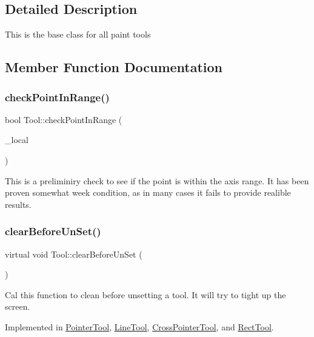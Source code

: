 \subsection{Detailed Description}
This is the base class for all paint tools 

\subsection{Member Function Documentation}
\mbox{\label{classTool_a81244366dc1b9f55465ed6f37b81033c}} 
\subsubsection{\texorpdfstring{check\+Point\+In\+Range()}{checkPointInRange()}}
{\footnotesize\ttfamily bool Tool\+::check\+Point\+In\+Range (\begin{DoxyParamCaption}\item[{const Q\+PointF \&}]{\+\_\+local }\end{DoxyParamCaption})\hspace{0.3cm}{\ttfamily [protected]}}

This is a preliminiry check to see if the point is within the axis range. It has been proven somewhat week condition, as in many cases it fails to provide realible results. \mbox{\label{classTool_a7d9e7d03f4a34d71850cbbfc16ca8532}} 
\subsubsection{\texorpdfstring{clear\+Before\+Un\+Set()}{clearBeforeUnSet()}}
{\footnotesize\ttfamily virtual void Tool\+::clear\+Before\+Un\+Set (\begin{DoxyParamCaption}{ }\end{DoxyParamCaption})\hspace{0.3cm}{\ttfamily [pure virtual]}}

Cal this function to clean before unsetting a tool. It will try to tight up the screen. 

Implemented in \mbox{\hyperlink{classPointerTool_a04c325128dc9ee27272eace9e70d15aa}{Pointer\+Tool}}, \mbox{\hyperlink{classLineTool_a2bcf5d5694e36445607c68c37e4f3f69}{Line\+Tool}}, \mbox{\hyperlink{classCrossPointerTool_a99e1b8f0669837dc5524c446e3dd401c}{Cross\+Pointer\+Tool}}, and \mbox{\hyperlink{classRectTool_a22ddb88797de61ed921a5cd3462383ea}{Rect\+Tool}}.



